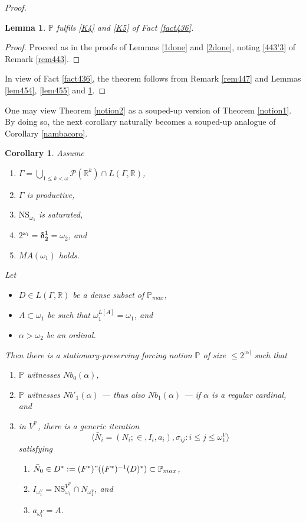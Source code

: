 \documentclass[12pt, twoside]{memoir}
\numberwithin{equation}{section}
\newtheorem{lem}[thm]{Lemma}
\newtheorem{cor}[thm]{Corollary}
\theoremstyle{definition}
\theoremstyle{remark}
\theoremstyle{definition}
\theoremstyle{definition}
\theoremstyle{definition}
\theoremstyle{remark}
\begin{document}
\begin{proof}
\begin{lem}\label{lem456}
$\mathbb{P}$ fulfils \ref{K4} and \ref{K5} of Fact \ref{fact436}.
\end{lem}

\begin{proof}
Proceed as in the proofs of Lemmas \ref{1done} and \ref{2done}, noting \ref{443'3} of Remark \ref{rem443}.
\end{proof}

In view of Fact \ref{fact436}, the theorem follows from Remark \ref{rem447} and Lemmas \ref{lem454}, \ref{lem455} and \ref{lem456}.
\end{proof}

One may view Theorem \ref{notion2} as a souped-up version of Theorem \ref{notion1}. By doing so, the next corollary naturally becomes a souped-up analogue of Corollary \ref{nambacoro}. 

\begin{cor}\label{nbcoro2}
Assume
\begin{enumerate}[label=(\roman*), leftmargin=40pt]
    \item $\Gamma  = \bigcup_{1 \leq k < \omega} \mathcal{P}(\mathbb{R}^{k}) \cap L(\Gamma, \mathbb{R})$,
    \item $\Gamma$ is productive,
    \item $\mathrm{NS}_{\omega_1}$ is saturated,
    \item $2^{\omega_1} = \mathbf{\delta^1_2} = \omega_2$, and
    \item $MA(\omega_1)$ holds.
\end{enumerate}
Let 
\begin{itemize}
    \item $D \in L(\Gamma, \mathbb{R})$ be a dense subset of $\mathbb{P}_{max}$,
    \item $A \subset \omega_1$ be such that $\omega_1^{L[A]} = \omega_1$, and
    \item $\alpha > \omega_2$ be an ordinal.
\end{itemize}
Then there is a stationary-preserving forcing notion $\mathbb{P}$ of size $\leq 2^{|\alpha|}$ such that
\begin{enumerate}[label=(\alph*)]
    \item $\mathbb{P}$ witnesses $Nb_0(\alpha)$,
    \item $\mathbb{P}$ witnesses $Nb'_1(\alpha)$ --- thus also $Nb_1(\alpha)$ --- if $\alpha$ is a regular cardinal, and
    \item in $V^{\mathbb{P}}$, there is a generic iteration $$\langle \bar{N}_i = (N_i; \in, I_i, a_i), \sigma_{ij} : i \leq j \leq \omega_1^V \rangle$$ satisfying 
    \begin{enumerate}[label=(\arabic*), leftmargin=40pt]
        \item $\bar{N}_0 \in D^* := (F^*) " ((F^*)^{-1}(D)^*) \subset \mathbb{P}_{max}$,
        \item $I_{\omega_1^V} = \mathrm{NS}_{\omega_1}^{V^{\mathbb{P}}} \cap N_{\omega_1^V}$, and
        \item $a_{\omega_1^V} = A$.
    \end{enumerate}
\end{enumerate}
\end{cor}
\end{document}
